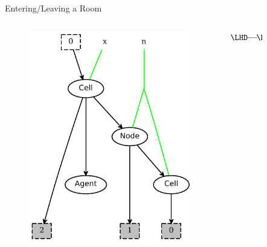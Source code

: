 \documentclass{beamer}
\providecommand\longdoublearrowRHD{\mathrel\LHD\joinrel\relbar\joinrel\relbar\joinrel\mathrel\RHD}
\begin{document}
\begin{frame}{Entering/Leaving a Room}
  \begin{columns}
    \begin{column}{0.45\textwidth}
      \begin{figure}
        \centering
        \includegraphics[width=\textwidth]{../models/agent2/goIn_lhs.pdf}
      \end{figure}
    \end{column}
    \begin{column}{0.1\textwidth}
      $\longdoublearrowRHD$
    \end{column}
    \begin{column}{0.45\textwidth}
      \begin{figure}
        \centering

\end{figure}
\end{column}
\end{columns}
\end{frame}
\end{document}
